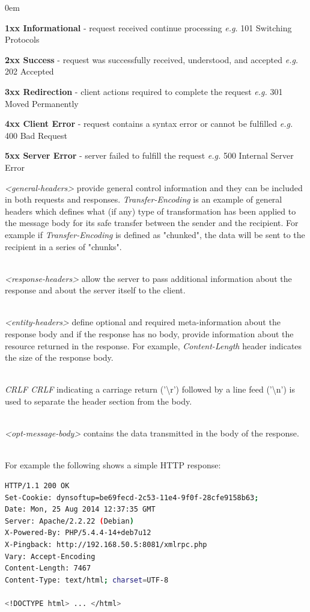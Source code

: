 \documentclass[a4paper,11pt,twoside]{report}
\begin{document}
\begin{list}{-}{}
\itemsep0em
\item \textbf{1xx Informational} - request received continue processing \textit{e.g.} 101 Switching Protocols
\item \textbf{2xx Success} - request was successfully received, understood, and accepted \textit{e.g.} 202 Accepted
\item \textbf{3xx Redirection} - client actions required to complete the request \textit{e.g.} 301 Moved Permanently
\item \textbf{4xx Client Error} - request contains a syntax error or cannot be fulfilled \textit{e.g.} 400 Bad Request
\item \textbf{5xx Server Error} - server failed to fulfill the request \textit{e.g.} 500 Internal Server Error
\end{list}
\noindent
\textit{<general-headers>} provide general control information and they can be included in both requests and responses. \textit{Transfer-Encoding} is an example of general headers which defines what (if any) type of transformation has been applied to the message body for its safe transfer between the sender and the recipient. For example if \textit{Transfer-Encoding} is defined as "chunked", the data will be sent to the recipient in a series of "chunks". 

\noindent\\
\textit{<response-headers>} allow the server to pass additional information about the response and about the server itself to the client. 

\noindent\\
\textit{<entity-headers>} define optional and required meta-information about the response body and if the response has no body, provide information about the resource returned in the response. For example, \textit{Content-Length} header indicates the size of the response body. 

\noindent\\
\textit{CRLF CRLF} indicating a carriage return ('\textbackslash r') followed by a line feed ('\textbackslash n') is used to separate the header section from the body. 

\noindent\\
\textit{<opt-message-body>} contains the data transmitted in the body of the response.

\noindent\\
For example the following shows a simple HTTP response:
\indent
\begin{lstlisting}[language=bash,xleftmargin=.25in,xrightmargin=.25in]
HTTP/1.1 200 OK
Set-Cookie: dynsoftup=be69fecd-2c53-11e4-9f0f-28cfe9158b63;
Date: Mon, 25 Aug 2014 12:37:35 GMT
Server: Apache/2.2.22 (Debian)
X-Powered-By: PHP/5.4.4-14+deb7u12
X-Pingback: http://192.168.50.5:8081/xmlrpc.php
Vary: Accept-Encoding
Content-Length: 7467
Content-Type: text/html; charset=UTF-8

<!DOCTYPE html> ... </html>
\end{lstlisting} 
\end{document}
